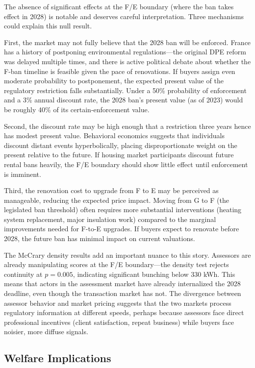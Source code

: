 \documentclass[12pt]{article}
\begin{document}
The absence of significant effects at the F/E boundary (where the ban takes effect in 2028) is notable and deserves careful interpretation. Three mechanisms could explain this null result.

First, the market may not fully believe that the 2028 ban will be enforced. France has a history of postponing environmental regulations---the original DPE reform was delayed multiple times, and there is active political debate about whether the F-ban timeline is feasible given the pace of renovations. If buyers assign even moderate probability to postponement, the expected present value of the regulatory restriction falls substantially. Under a 50\% probability of enforcement and a 3\% annual discount rate, the 2028 ban's present value (as of 2023) would be roughly 40\% of its certain-enforcement value.

Second, the discount rate may be high enough that a restriction three years hence has modest present value. Behavioral economics suggests that individuals discount distant events hyperbolically, placing disproportionate weight on the present relative to the future. If housing market participants discount future rental bans heavily, the F/E boundary should show little effect until enforcement is imminent.

Third, the renovation cost to upgrade from F to E may be perceived as manageable, reducing the expected price impact. Moving from G to F (the legislated ban threshold) often requires more substantial interventions (heating system replacement, major insulation work) compared to the marginal improvements needed for F-to-E upgrades. If buyers expect to renovate before 2028, the future ban has minimal impact on current valuations.

The McCrary density results add an important nuance to this story. Assessors are already manipulating scores at the F/E boundary---the density test rejects continuity at $p = 0.005$, indicating significant bunching below 330 kWh. This means that actors in the assessment market have already internalized the 2028 deadline, even though the transaction market has not. The divergence between assessor behavior and market pricing suggests that the two markets process regulatory information at different speeds, perhaps because assessors face direct professional incentives (client satisfaction, repeat business) while buyers face noisier, more diffuse signals.

\subsection{Welfare Implications}
\end{document}
